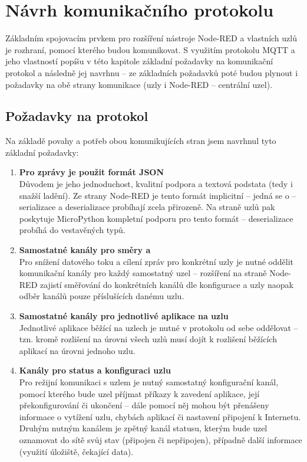 \chapter{Návrh komunikačního protokolu}
\label{ch:protokol}

Základním spojovacím prvkem pro rozšíření nástroje Node-RED a vlastních uzlů je rozhraní, pomocí kterého budou
komunikovat.
S využitím protokolu MQTT a jeho vlastností popíšu v této kapitole základní požadavky na komunikační protokol a
následně jej navrhnu -- ze základních požadavků poté budou plynout i požadavky na obě strany komunikace (uzly i
Node-RED -- centrální uzel).

\section{Požadavky na protokol}\label{sec:pozadavky-na-protokol}
Na základě povahy a potřeb obou komunikujících stran jsem navrhnul tyto základní požadavky:
\begin{enumerate}
    \item \textbf{Pro zprávy je použit formát JSON} \\
    Důvodem je jeho jednoduchost, kvalitní podpora a textová podstata (tedy i snažší ladění).
    Ze strany Node-RED je tento formát implicitní -- jedná se o  -- serializace a
    deserializace probíhají zcela přirozeně.
    Na straně uzlů pak poskytuje MicroPython kompletní podporu pro tento formát -- deserializace probíhá do
    vestavěných typů.

    \item \textbf{Samostatné kanály pro směry  a } \\
    Pro snížení datového toku a cílení zpráv pro konkrétní uzly je nutné oddělit komunikační kanály pro každý
    samostatný uzel -- rozšíření na straně Node-RED zajistí směřování do konkrétních kanálů dle konfigurace a uzly
    naopak odběr kanálů pouze příslušících danému uzlu.

    \item \textbf{Samostatné kanály pro jednotlivé aplikace na uzlu}  \\
    Jednotlivé aplikace běžící na uzlech je nutné v protokolu od sebe oddělovat -- tzn. kromě rozlišení na úrovni
    všech uzlů musí dojít k rozlišení běžících aplikací na úrovni jednoho uzlu.

    \item \textbf{Kanály pro status a konfiguraci uzlu} \\
    Pro režijní komunikaci s uzlem je nutný samostatný konfigurační kanál, pomocí kterého bude uzel příjmat příkazy k
    zavedení aplikace, její překonfigurování či ukončení -- dále pomocí něj mohou být přenášeny informace o vytížení
    uzlu, chybách aplikací či nastavení připojení k Internetu.
    Druhým nutným kanálem je zpětný kanál statusu, kterým bude uzel oznamovat do sítě svůj stav (připojen či
    nepřipojen), případně další informace (využití úložiště, čekající data).
\end{enumerate}

